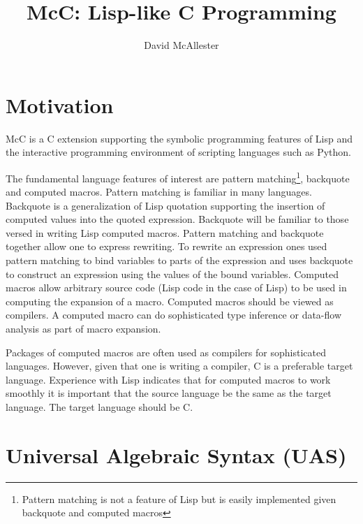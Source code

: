 \documentclass{article}
\title{McC:  Lisp-like C Programming}
\author{David McAllester}
\begin{document}
\maketitle

\section{Motivation}

\bigskip
\bigskip

McC is a C extension supporting the symbolic programming features of Lisp and the interactive programming environment of scripting languages such as Python.

The fundamental language features of interest are pattern matching\footnote{Pattern matching is not a feature of Lisp but is easily implemented given backquote and computed macros},
backquote and computed macros. Pattern matching is familiar in many languages.  Backquote is a generalization of Lisp quotation supporting
the insertion of computed values into the quoted expression. Backquote will be familiar to
those versed in writing Lisp computed macros. Pattern matching and backquote together allow one to express rewriting.  To rewrite an expression
ones used pattern matching to bind variables to parts of the expression and uses backquote to construct an expression using the values of the bound variables.
Computed macros allow arbitrary source code (Lisp code in the case of Lisp) to be
used in computing the expansion of a macro.  Computed macros should be viewed as compilers.  A computed macro can do
sophisticated type inference or data-flow analysis as part of macro expansion.

Packages of computed macros are often used as compilers for sophisticated languages.  However, given that one is writing a compiler, C is a preferable target language.
Experience with Lisp indicates that for computed macros to work smoothly it is important that the source language be the same as the target language.  The target language should be C.

\section{Universal Algebraic Syntax (UAS)}
\end{document}
